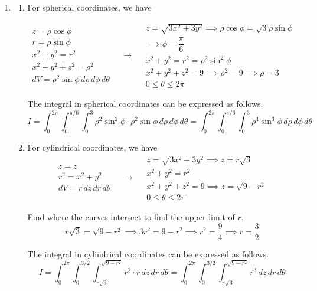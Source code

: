 \documentclass[a4paper, 12pt]{article}
\begin{document}
\begin{enumerate}[leftmargin=*,label=\textbf{\arabic*.}]
\item \begin{enumerate}[leftmargin=*,label=\textbf{\alph*.}]
\item For spherical coordinates, we have

\[
\begin{array}{c}
z=\rho\cos\phi\\
r=\rho\sin\phi\\
x^2+y^2=r^2\\
x^2+y^2+z^2=\rho^2\\
dV=\rho^2\sin\phi\,d\rho\,d\phi\,d\theta
\end{array}\quad\rightarrow\quad
\begin{array}{c}
z=\sqrt{3x^2+3y^2}\implies\rho\cos\phi=\sqrt3\rho\sin\phi\\\implies\phi=\dfrac\pi6\\[0.2cm]
x^2+y^2=r^2=\rho^2\sin^2\phi\\[0.1cm]
x^2+y^2+z^2=9\implies\rho^2=9\implies\rho=3\\[0.1cm]
0\leq\theta\leq2\pi
\end{array}
\]

The integral in spherical coordinates can be expressed as follows.
\[\boxed{{I}=\int_0^{2\pi}\int_0^{\pi/6}\int_{0}^3\rho^2\sin^2\phi\cdot\rho^2\sin\phi\,d\rho\,d\phi\,d\theta=\int_0^{2\pi}\int_0^{\pi/6}\int_{0}^3\rho^4\sin^3\phi\,d\rho\,d\phi\,d\theta}\]

\item For cylindrical coordinates, we have
\[
\begin{array}{c}
z=z\\
r^2=x^2+y^2\\
dV=r\,dz\,dr\,d\theta
\end{array}\quad\rightarrow\quad
\begin{array}{c}
z=\sqrt{3x^2+3y^2}\implies z=r\sqrt3\\[0.1cm]
x^2+y^2=r^2\\[0.1cm]
x^2+y^2+z^2=9\implies z=\sqrt{9-r^2}\\[0.1cm]
0\leq\theta\leq2\pi
\end{array}
\]

Find where the curves intersect to find the upper limit of $r$.
\[r\sqrt3=\sqrt{9-r^2}\implies3r^2=9-r^2\implies r^2=\frac94\implies r=\frac32\]

The integral in cylindrical coordinates can be expressed as follows.
\[\boxed{{I}=\int_0^{2\pi}\int_0^{3/2}\int_{r\sqrt3}^{\sqrt{9-r^2}}r^2\cdot r\,dz\,dr\,d\theta=\int_0^{2\pi}\int_0^{3/2}\int_{r\sqrt3}^{\sqrt{9-r^2}}r^3\,dz\,dr\,d\theta}\]
\end{enumerate}
\end{enumerate}
\end{document}
